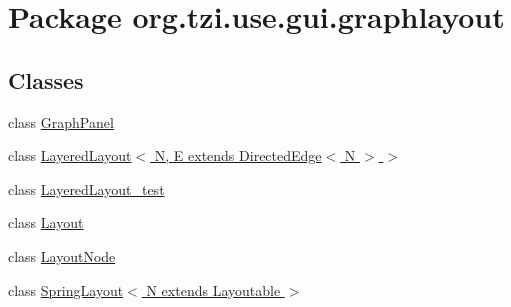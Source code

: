 \hypertarget{namespaceorg_1_1tzi_1_1use_1_1gui_1_1graphlayout}{\section{Package org.\-tzi.\-use.\-gui.\-graphlayout}
\label{namespaceorg_1_1tzi_1_1use_1_1gui_1_1graphlayout}
}
\subsection*{Classes}
\begin{DoxyCompactItemize}
\item 
class \hyperlink{classorg_1_1tzi_1_1use_1_1gui_1_1graphlayout_1_1_graph_panel}{Graph\-Panel}
\item 
class \hyperlink{classorg_1_1tzi_1_1use_1_1gui_1_1graphlayout_1_1_layered_layout_3_01_n_00_01_e_01extends_01_directed_edge_3_01_n_01_4_01_4}{Layered\-Layout$<$ N, E extends Directed\-Edge$<$ N $>$ $>$}
\item 
class \hyperlink{classorg_1_1tzi_1_1use_1_1gui_1_1graphlayout_1_1_layered_layout__test}{Layered\-Layout\-\_\-test}
\item 
class \hyperlink{classorg_1_1tzi_1_1use_1_1gui_1_1graphlayout_1_1_layout}{Layout}
\item 
class \hyperlink{classorg_1_1tzi_1_1use_1_1gui_1_1graphlayout_1_1_layout_node}{Layout\-Node}
\item 
class \hyperlink{classorg_1_1tzi_1_1use_1_1gui_1_1graphlayout_1_1_spring_layout_3_01_n_01extends_01_layoutable_01_4}{Spring\-Layout$<$ N extends Layoutable $>$}
\end{DoxyCompactItemize}
